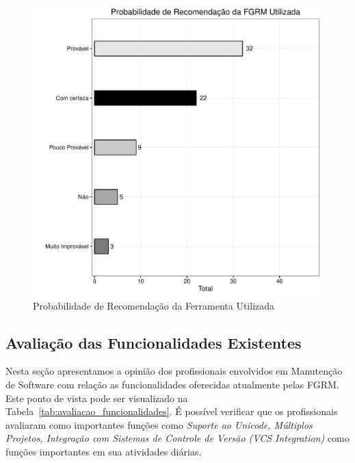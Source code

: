 \begin{figure}[htpb]
	\centering
	\includegraphics[width=0.8\linewidth]{./chapter-pesquisa-com-profissionais/img/grafico_melhorias_fgrm_probabilidade_recomentacao.pdf}
	\caption{Probabilidade de Recomendação da Ferramenta Utilizada}
\label{fig:grafico_melhorias_fgrm_probabilidade_recomentacao}
\end{figure}

\subsection{Avaliação das Funcionalidades Existentes}
\label{sub:avaliação_das_funcionalidades_existentes}

Nesta seção apresentamos a opinião dos profissionais envolvidos em Manutenção de
Software com relação as funcionalidades oferecidas atualmente pelas FGRM\@. Este
ponto de vista pode ser visualizado na
Tabela~\ref{tab:avaliacao_funcionalidades}. É possível verificar que os
profissionais avaliaram como importantes funções como \textit{Suporte ao
	Unicode, Múltiplos Projetos, Integração com Sistemas de Controle de Versão
	(VCS Integration)} como  funções importantes em sua atividades diárias. 

